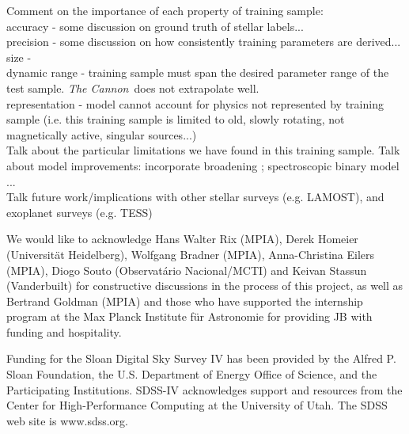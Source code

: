 \documentclass[modern]{aastex62}
\newcommand{\thecannon}{\textsl{The Cannon}}
\begin{document}
Comment on the importance of each property of training sample: \\
accuracy - some discussion on ground truth of stellar labels... \\
precision - some discussion on how consistently training parameters are derived... \\
size -  \\
dynamic range - training sample must span the desired parameter range of the test sample. \thecannon\ does not extrapolate well. \\
representation - model cannot account for physics not represented by training sample (i.e. this training sample is limited to old, slowly rotating, not magnetically active, singular sources...) \\

Talk about the particular limitations we have found in this training sample. Talk about model improvements: incorporate broadening \citep{Behmard2019}; spectroscopic binary model \citep{ElBadry:2018}... \\

Talk future work/implications with other stellar surveys (e.g. LAMOST), and exoplanet surveys (e.g. TESS)



\acknowledgements
We would like to acknowledge Hans Walter Rix (MPIA), Derek Homeier (Universit{\"a}t Heidelberg), Wolfgang Bradner (MPIA), Anna-Christina Eilers (MPIA), Diogo Souto (Observatário Nacional/MCTI) and Keivan Stassun (Vanderbuilt) for constructive discussions in the process of this project, as well as Bertrand Goldman (MPIA) and those who have supported the internship program at the Max Planck Institute f{\"u}r Astronomie for providing JB with funding and hospitality.

Funding for the Sloan Digital Sky Survey IV has been provided by the Alfred P. Sloan Foundation, the U.S. Department of Energy Office of Science, and the Participating Institutions. SDSS-IV acknowledges support and resources from the Center for High-Performance Computing at
the University of Utah. The SDSS web site is www.sdss.org.
\end{document}
